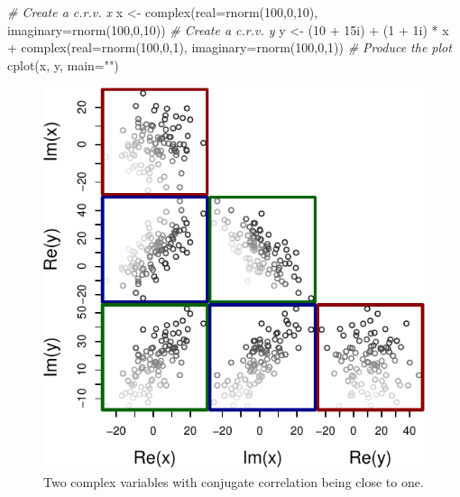 \documentclass[
]{book}
\newenvironment{Shaded}{\begin{snugshade}}{\end{snugshade}}
\newcommand{\AttributeTok}[1]{\textcolor[rgb]{0.77,0.63,0.00}{#1}}
\newcommand{\CommentTok}[1]{\textcolor[rgb]{0.56,0.35,0.01}{\textit{#1}}}
\newcommand{\DecValTok}[1]{\textcolor[rgb]{0.00,0.00,0.81}{#1}}
\newcommand{\FunctionTok}[1]{\textcolor[rgb]{0.00,0.00,0.00}{#1}}
\newcommand{\NormalTok}[1]{#1}
\newcommand{\OtherTok}[1]{\textcolor[rgb]{0.56,0.35,0.01}{#1}}
\newcommand{\SpecialCharTok}[1]{\textcolor[rgb]{0.00,0.00,0.00}{#1}}
\newcommand{\StringTok}[1]{\textcolor[rgb]{0.31,0.60,0.02}{#1}}
\begin{document}
\begin{Shaded}
\begin{Highlighting}[]
\CommentTok{\# Create a c.r.v. x}
\NormalTok{x }\OtherTok{\textless{}{-}} \FunctionTok{complex}\NormalTok{(}\AttributeTok{real=}\FunctionTok{rnorm}\NormalTok{(}\DecValTok{100}\NormalTok{,}\DecValTok{0}\NormalTok{,}\DecValTok{10}\NormalTok{), }\AttributeTok{imaginary=}\FunctionTok{rnorm}\NormalTok{(}\DecValTok{100}\NormalTok{,}\DecValTok{0}\NormalTok{,}\DecValTok{10}\NormalTok{))}
\CommentTok{\# Create a c.r.v. y}
\NormalTok{y }\OtherTok{\textless{}{-}}\NormalTok{ (}\DecValTok{10} \SpecialCharTok{+}\NormalTok{ 15i) }\SpecialCharTok{+}\NormalTok{ (}\DecValTok{1} \SpecialCharTok{+}\NormalTok{ 1i) }\SpecialCharTok{*}\NormalTok{ x }\SpecialCharTok{+}
    \FunctionTok{complex}\NormalTok{(}\AttributeTok{real=}\FunctionTok{rnorm}\NormalTok{(}\DecValTok{100}\NormalTok{,}\DecValTok{0}\NormalTok{,}\DecValTok{1}\NormalTok{), }\AttributeTok{imaginary=}\FunctionTok{rnorm}\NormalTok{(}\DecValTok{100}\NormalTok{,}\DecValTok{0}\NormalTok{,}\DecValTok{1}\NormalTok{))}
\CommentTok{\# Produce the plot}
\FunctionTok{cplot}\NormalTok{(x, y, }\AttributeTok{main=}\StringTok{""}\NormalTok{)}
\end{Highlighting}
\end{Shaded}

\begin{figure}
\centering
\includegraphics{Svetunkov---Svetunkov---Complex-Valued-Econometrics_files/figure-latex/crvCorConjugate-1.pdf}
\caption{\label{fig:crvCorConjugate}Two complex variables with conjugate correlation being close to one.}
\end{figure}
\end{document}
